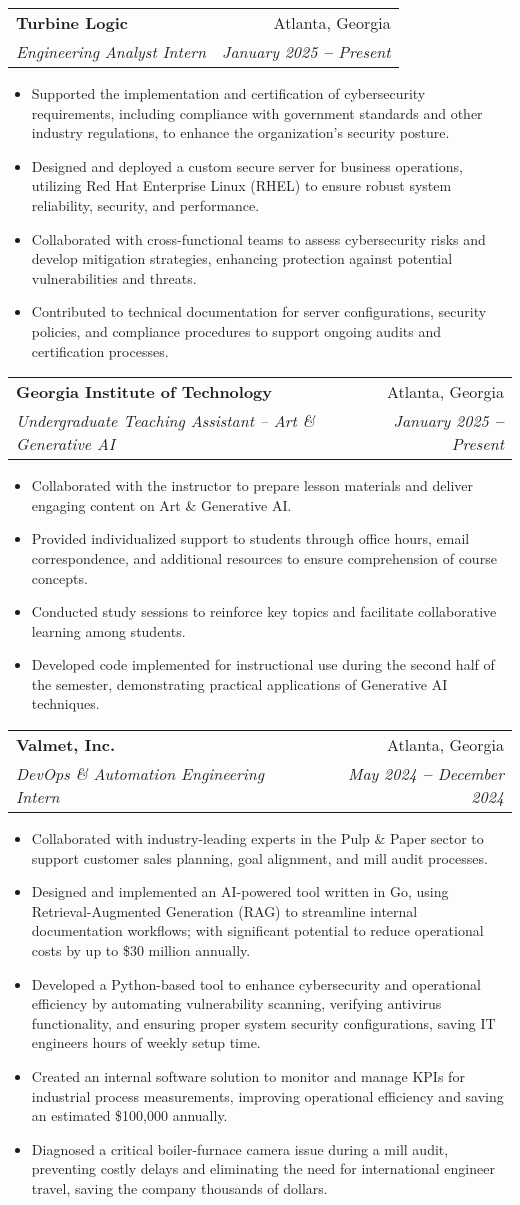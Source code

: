 \documentclass[letterpaper,11pt]{article}
\makeatletter
\newcommand{\resumeItem}[1]{
  \item\small{
    {#1 \vspace{-2pt}}
  }
}
\newcommand{\resumeSubheading}[4]{
  \vspace{-2pt}\item
    \begin{tabular*}{0.97\textwidth}[t]{l@{\extracolsep{\fill}}r}
      \textbf{#1} & #2 \\
      \textit{\small#3} & \textit{\small #4} \\
    \end{tabular*}\vspace{-7pt}
}
\newcommand{\resumeItemListStart}{\begin{itemize}}
\newcommand{\resumeItemListEnd}{\end{itemize}\vspace{-5pt}}
\makeatother
\begin{document}
\resumeSubheading
    {Turbine Logic}{Atlanta, Georgia}
    {Engineering Analyst Intern}{January 2025 \textbf{--} Present}
    \resumeItemListStart
    \resumeItem{Supported the implementation and certification of cybersecurity requirements, including compliance with government standards and other industry regulations, to enhance the organization's security posture.}
    \resumeItem{Designed and deployed a custom secure server for business operations, utilizing Red Hat Enterprise Linux (RHEL) to ensure robust system reliability, security, and performance.}
    \resumeItem{Collaborated with cross-functional teams to assess cybersecurity risks and develop mitigation strategies, enhancing protection against potential vulnerabilities and threats.}
    \resumeItem{Contributed to technical documentation for server configurations, security policies, and compliance procedures to support ongoing audits and certification processes.}
    \resumeItemListEnd

      \resumeSubheading
      {Georgia Institute of Technology}{Atlanta, Georgia}
      {Undergraduate Teaching Assistant – Art \& Generative AI}{January 2025 \textbf{--} Present}
        \resumeItemListStart
            \resumeItem{Collaborated with the instructor to prepare lesson materials and deliver engaging content on Art \& Generative AI.}
            \resumeItem{Provided individualized support to students through office hours, email correspondence, and additional resources to ensure comprehension of course concepts.}
            \resumeItem{Conducted study sessions to reinforce key topics and facilitate collaborative learning among students.}
            \resumeItem{Developed code implemented for instructional use during the second half of the semester, demonstrating practical applications of Generative AI techniques.}
        \resumeItemListEnd

\resumeSubheading
    {Valmet, Inc.}{Atlanta, Georgia}
    {DevOps \& Automation Engineering Intern}{May 2024 \textbf{--} December 2024}
    \resumeItemListStart
    \resumeItem{Collaborated with industry-leading experts in the Pulp \& Paper sector to support customer sales planning, goal alignment, and mill audit processes.}
    \resumeItem{Designed and implemented an AI-powered tool written in Go, using Retrieval-Augmented Generation (RAG) to streamline internal documentation workflows; with significant potential to reduce operational costs by up to \$30 million annually.}
    \resumeItem{Developed a Python-based tool to enhance cybersecurity and operational efficiency by automating vulnerability scanning, verifying antivirus functionality, and ensuring proper system security configurations, saving IT engineers hours of weekly setup time.}
    \resumeItem{Created an internal software solution to monitor and manage KPIs for industrial process measurements, improving operational efficiency and saving an estimated \$100,000 annually.}
    \resumeItem{Diagnosed a critical boiler-furnace camera issue during a mill audit, preventing costly delays and eliminating the need for international engineer travel, saving the company thousands of dollars.}
    \resumeItemListEnd
    
\end{document}
